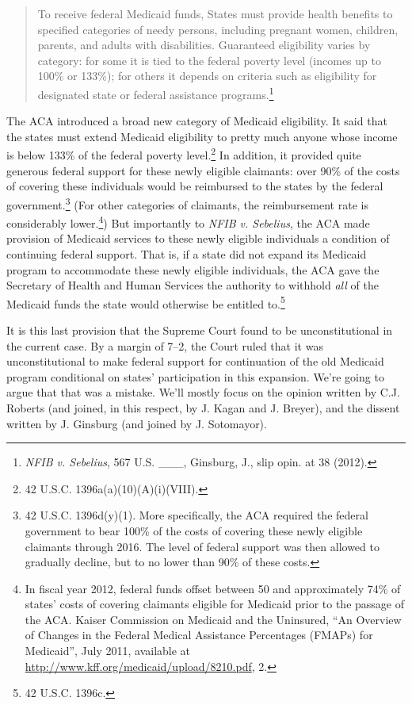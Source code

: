 \documentclass[
  11pt,
  letterpaper,
  DIV=11,
  numbers=noendperiod,
  twoside]{scrartcl}
\begin{document}
\begin{quote}
To receive federal Medicaid funds, States must provide health benefits
to specified categories of needy persons, including pregnant women,
children, parents, and adults with disabilities. Guaranteed eligibility
varies by category: for some it is tied to the federal poverty level
(incomes up to 100\% or 133\%); for others it depends on criteria such
as eligibility for designated state or federal assistance
programs.\footnote{\emph{NFIB v. Sebelius}, 567 U.S. \_\_\_, Ginsburg,
  J., slip opin. at 38 (2012).}
\end{quote}

The ACA introduced a broad new category of Medicaid eligibility. It said
that the states must extend Medicaid eligibility to pretty much anyone
whose income is below 133\% of the federal poverty level.\footnote{42
  U.S.C. 1396a(a)(10)(A)(i)(VIII).} In addition, it provided quite
generous federal support for these newly eligible claimants: over 90\%
of the costs of covering these individuals would be reimbursed to the
states by the federal government.\footnote{42 U.S.C. 1396d(y)(1). More
  specifically, the ACA required the federal government to bear 100\% of
  the costs of covering these newly eligible claimants through 2016. The
  level of federal support was then allowed to gradually decline, but to
  no lower than 90\% of these costs.} (For other categories of
claimants, the reimbursement rate is considerably lower.\footnote{In
  fiscal year 2012, federal funds offset between 50 and approximately
  74\% of states' costs of covering claimants eligible for Medicaid
  prior to the passage of the ACA. Kaiser Commission on Medicaid and the
  Uninsured, ``An Overview of Changes in the Federal Medical Assistance
  Percentages (FMAPs) for Medicaid'', July 2011, available at
  \url{http://www.kff.org/medicaid/upload/8210.pdf}, 2.}) But
importantly to \emph{NFIB v. Sebelius}, the ACA made provision of
Medicaid services to these newly eligible individuals a condition of
continuing federal support. That is, if a state did not expand its
Medicaid program to accommodate these newly eligible individuals, the
ACA gave the Secretary of Health and Human Services the authority to
withhold \emph{all} of the Medicaid funds the state would otherwise be
entitled to.\footnote{42 U.S.C. 1396c.}

It is this last provision that the Supreme Court found to be
unconstitutional in the current case. By a margin of 7--2, the Court
ruled that it was unconstitutional to make federal support for
continuation of the old Medicaid program conditional on states'
participation in this expansion. We're going to argue that that was a
mistake. We'll mostly focus on the opinion written by C.J. Roberts (and
joined, in this respect, by J. Kagan and J. Breyer), and the dissent
written by J. Ginsburg (and joined by J. Sotomayor).
\end{document}

